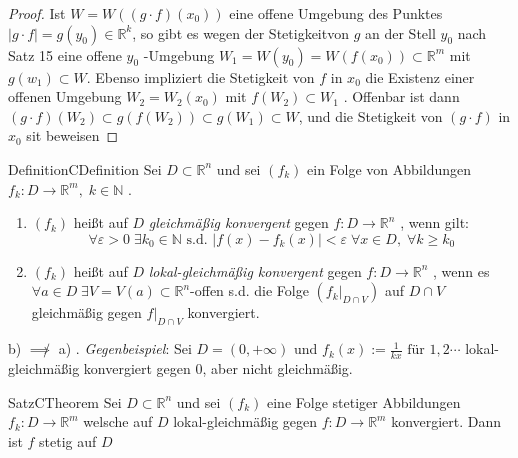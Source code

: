 \documentclass[11.5 pt, a4paper]{memoir}
\begin{document}
\begin{proof}
	Ist $ W = W \left( \left( g \cdot f \right) \left( x_0 \right)  \right)  $ eine offene Umgebung des Punktes $ \left| g \cdot f\right| 
	= g(y_0) \in \mathbb{R}^k $, so gibt es wegen der Stetigkeitvon $ g $ an der Stell $ y_0 $ nach Satz 15 eine offene $ y_0 $ -Umgebung
	$ W_1 = W(y_0) = W \left( f \left( x_0 \right)  \right) \subset  \mathbb{R}^m $ mit $ g \left( w_1 \right) \subset W $. Ebenso 
	impliziert die Stetigkeit von $ f $ in $ x_0 $ die Existenz einer offenen Umgebung $ W_2 = W_2 \left( x_0 \right) $ mit
	$ f \left( W_2 \right) \subset W_1 $ . Offenbar ist dann $ \left( g \cdot f \right) \left( W_2 \right) \subset g \left( f 
	\left( W_2 \right) \right) \subset g \left( W_1 \right) \subset W $, und die Stetigkeit von $ \left( g \cdot f \right)  $ in
	$ x_0 $ sit beweisen
\end{proof}
\begin{ibox}[]{Definition}{CDefinition}
    Sei $ D \subset \mathbb{R}^n  $ und sei $ \left( f_{k} \right)  $ ein Folge von Abbildungen $ f_{k}: D \to \mathbb{R}^m, \; k \in 
	\mathbb{N} $ .
	\begin{enumerate}[label=\alph*)]
		\item $ \left( f_{k} \right)  $ heißt auf $ D $  \textit{gleichmäßig konvergent} gegen $ f: D \to \mathbb{R}^n $ , wenn gilt:
			$$ \forall \varepsilon > 0 \; \exists k_0 \in \mathbb{N} \text{ s.d. } \left| f(x) - f_{k}(x) \right| < \varepsilon \; 
			\forall x \in  D, \; \forall k \geq k_0$$
		\item $ \left( f_{k} \right)  $ heißt auf $ D $  \textit{lokal-gleichmäßig konvergent} gegen $ f: D \to \mathbb{R}^n $ , wenn es
			$ \forall a \in D \; \exists V = V(a) \subset  \mathbb{R}^n $-offen s.d. die Folge 
			$ \left( \left. f_{k} \right|_{D \cap V} \right)  $ auf $ D \cap V $ gleichmäßig gegen 
			$ \left. f \right|_{D \cap V}  $ konvergiert.
	\end{enumerate}
\end{ibox}

b) $\not \implies$ a) . \textit{Gegenbeispiel}: Sei $ D = (0, + \infty) $ und $ f_{k}(x) := \frac{1}{kx} \text{ für } 1,2 \cdots  $ 
lokal-gleichmäßig konvergiert gegen $ 0 $, aber nicht gleichmäßig.

\begin{ibox}[20]{Satz}{CTheorem}
    Sei $ D \subset  \mathbb{R}^n  $ und sei $ \left( f_k \right)  $ eine Folge stetiger Abbildungen $ f_k : D \to \mathbb{R}^m $ 
	welsche auf $ D $ lokal-gleichmäßig gegen $ f: D \to \mathbb{R}^m $ konvergiert. Dann ist $ f $ stetig auf $ D $ 
\end{ibox}
\end{document}
